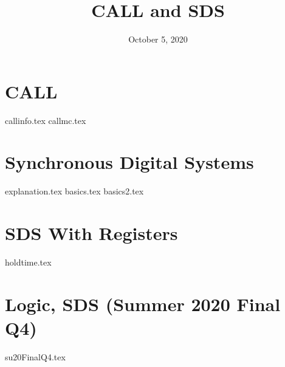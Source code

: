 \documentclass[11pt]{exam}
\title{CALL and SDS}
\date{October 5, 2020}
\begin{document}
\maketitle

\section{CALL}
\begin{questions}
{callinfo.tex}
{callmc.tex}
\end{questions}
\newpage

\section{Synchronous Digital Systems}
\begin{questions}
{explanation.tex}
{basics.tex}
{basics2.tex}
\end{questions}
\newpage

\section{SDS With Registers}
\begin{questions}
{holdtime.tex}
\end{questions}
\newpage

\section{Logic, SDS (Summer 2020 Final Q4)}
\begin{questions}
{su20FinalQ4.tex}
\end{questions}
\newpage
\end{document}
